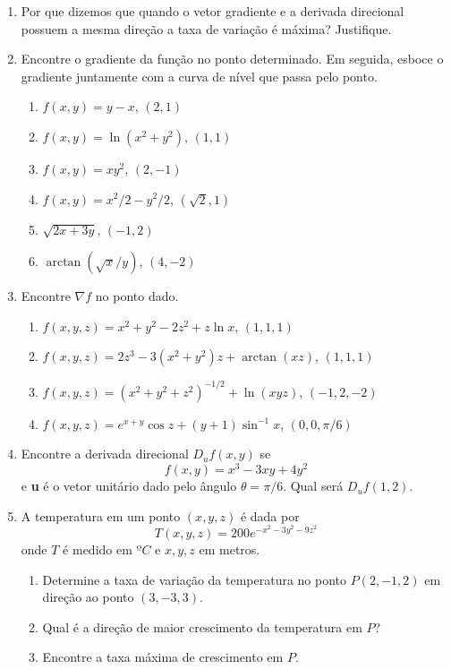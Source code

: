 \documentclass[11pt,a4paper]{article}
\begin{document}
\begin{enumerate}
	 \item Por que dizemos que quando o vetor gradiente e a derivada direcional possuem a mesma direção a taxa de variação é máxima? Justifique. 
	 
	 \item Encontre o gradiente da função no ponto determinado. Em seguida, esboce o gradiente juntamente com a curva de nível que passa pelo ponto.
	 \begin{enumerate}
	 	\item $f(x,y) = y - x$, \quad $(2,1)$
	 	\item $f(x,y) = \ln (x^2 + y^2)$, \quad $(1,1)$
	 	\item $f(x,y) = xy^2$, \quad $(2,-1)$
	 	\item $f(x,y) = x^2/2 - y^2/2$, \quad $(\sqrt{2},1)$
	 	\item $\sqrt{2x + 3y}$, \quad $(-1,2)$
	 	\item $\arctan (\sqrt{x}/y)$, \quad $(4,-2)$
	 \end{enumerate}
	 
	 \item Encontre $\nabla f$ no ponto dado.
	 \begin{enumerate}
	 	\item $f(x,y,z) = x^2 + y^2 - 2z^2 + z\ln x$, \quad $(1,1,1)$
	 	\item $f(x,y,z) = 2z^3 - 3(x^2 + y^2)z + \arctan (xz)$, \quad $(1,1,1)$
	 	\item $f(x,y,z) = (x^2 + y^2 + z^2)^{-1/2} + \ln (xyz)$, \quad $(-1,2,-2)$
	 	\item $f(x,y,z) = e^{x + y}\cos z + (y + 1) \sin^{-1} x$, \quad $(0,0,\pi /6)$
	 	
	 \end{enumerate}
	 
	 \item Encontre a derivada direcional $D_u f(x,y)$ se 
	 $$f(x,y) = x^3 - 3xy + 4y^2$$
	 e \textbf{u} é o vetor unitário dado pelo ângulo $\theta = \pi / 6$. Qual será $D_u f(1,2)$.
	 \item A temperatura em um ponto $(x,y,z)$ é dada por 
	 $$T(x,y,z) = 200e^{-x^2 - 3y^2 - 9z^2}$$
	 onde $T$ é medido em $ºC$ e $x,y,z$ em metros.
	 \begin{enumerate}
	 	\item Determine a taxa de variação da temperatura no ponto $P(2,-1,2)$ em direção ao ponto $(3,-3,3)$.
	 	\item Qual é a direção de maior crescimento da temperatura em $P$?
	 	\item Encontre a taxa máxima de crescimento em $P$.
	 

\end{enumerate}
\end{enumerate}
\end{document}
